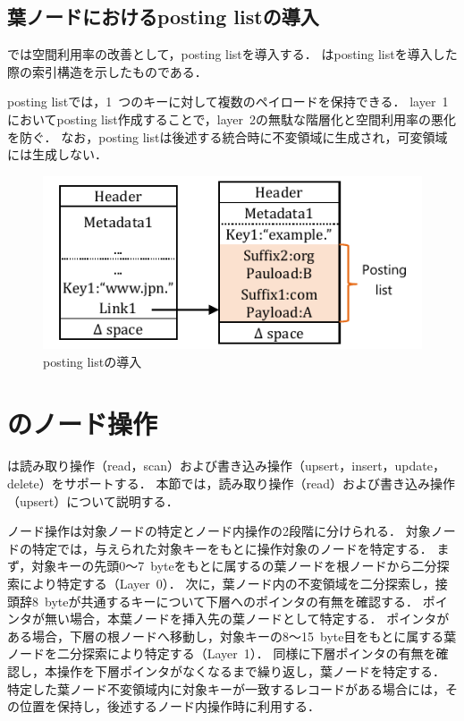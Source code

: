 \subsection{葉ノードにおけるposting listの導入}
\Bcforest{}では空間利用率の改善として，posting listを導入する．
\Fig{\ref{fig:posting_list}}はposting listを導入した際の索引構造を示したものである．

posting listでは，1~つのキーに対して複数のペイロードを保持できる．
layer~1においてposting list作成することで，layer~2の無駄な階層化と空間利用率の悪化を防ぐ．
なお，posting listは後述する統合時に不変領域に生成され，可変領域には生成しない．

\begin{figure}[t]
    \centering
    \includegraphics{./figures/posting_list.pdf}
    \caption{posting listの導入}
    \label{fig:posting_list}
\end{figure}

\section{\Bcforest{}のノード操作}
\label{sec:node_operation}
\Bcforest{}は読み取り操作（read，scan）および書き込み操作（upsert，insert，update，delete）をサポートする．
本節では，読み取り操作（read）および書き込み操作（upsert）について説明する．

ノード操作は対象ノードの特定とノード内操作の2段階に分けられる．
対象ノードの特定では，与えられた対象キーをもとに操作対象のノードを特定する．
まず，対象キーの先頭0～7~byteをもとに属するの葉ノードを根ノードから二分探索により特定する（Layer~0）．
次に，葉ノード内の不変領域を二分探索し，接頭辞8~byteが共通するキーについて下層へのポインタの有無を確認する．
ポインタが無い場合，本葉ノードを挿入先の葉ノードとして特定する．
ポインタがある場合，下層の根ノードへ移動し，対象キーの8～15~byte目をもとに属する葉ノードを二分探索により特定する（Layer~1）．
同様に下層ポインタの有無を確認し，本操作を下層ポインタがなくなるまで繰り返し，葉ノードを特定する．
特定した葉ノード不変領域内に対象キーが一致するレコードがある場合には，その位置を保持し，後述するノード内操作時に利用する．

